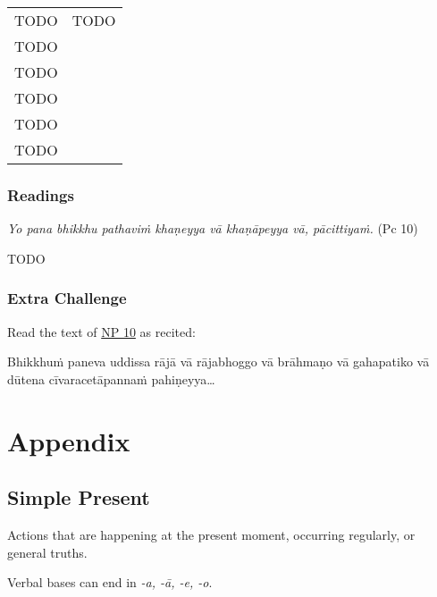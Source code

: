 \documentclass[11pt,oneside]{memoir}
\begin{document}
\renewcommand{\arraystretch}{1.8}

\begin{center}
\begin{tabular}{ll}
TODO & TODO\\[0pt]
TODO & \\[0pt]
TODO & \\[0pt]
TODO & \\[0pt]
TODO & \\[0pt]
TODO & \\[0pt]
\end{tabular}
\end{center}

\normalArrayStrech

\subsection{Readings}
\label{sec:org63809e0}

\emph{Yo pana bhikkhu pathaviṁ khaṇeyya vā khaṇāpeyya vā, pācittiyaṁ.} (Pc 10)

TODO

\subsection{Extra Challenge}
\label{sec:orgd8d86e9}

Read the text of \href{https://suttacentral.net/pli-tv-bu-vb-np10/en/brahmali}{NP 10} as recited:

Bhikkhuṁ paneva uddissa rājā vā rājabhoggo vā brāhmaṇo vā gahapatiko vā dūtena cīvaracetāpannaṁ pahiṇeyya\ldots{}

\chapter{Appendix}
\label{sec:orgfa28a84}
\section{Simple Present}
\label{sec:org9f1e810}

Actions that are happening at the present moment, occurring regularly, or general truths.

Verbal bases can end in \emph{-a, -ā, -e, -o}.
\end{document}
